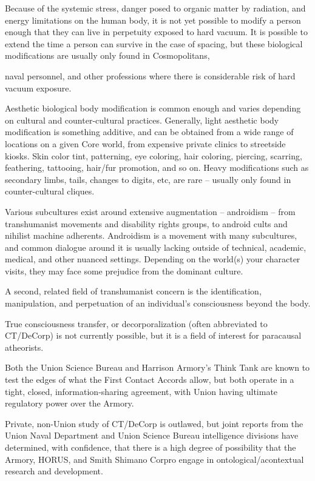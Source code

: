 Because of the systemic stress, danger posed to organic matter by radiation, and energy  
limitations on the human body, it is not yet possible to modify a person enough that they can live  
in perpetuity exposed to hard vacuum. It is possible to extend the time a person can survive in  
the case of spacing, but these biological modifications are usually only found in Cosmopolitans,  

                                                                                                                  


naval personnel, and other professions where there is considerable risk of hard vacuum  
exposure.  
 

Aesthetic biological body modification is common enough and varies depending on cultural and  
counter-cultural practices. Generally, light aesthetic body modification is something additive, and  
can be obtained from a wide range of locations on a given Core world, from expensive private  
clinics to streetside kiosks. Skin color tint, patterning, eye coloring, hair coloring, piercing,  
scarring, feathering, tattooing, hair/fur promotion, and so on. Heavy modifications such as  
secondary limbs, tails, changes to digits, etc, are rare -- usually only found in counter-cultural  
cliques.   
 

Various subcultures exist around extensive augmentation -- androidism -- from transhumanist  
movements and disability rights groups, to android cults and nihilist machine adherents.  
Androidism is a movement with many subcultures, and common dialogue around it is usually  
lacking outside of technical, academic, medical, and other nuanced settings. Depending on the  
world(s) your character visits, they may face some prejudice from the dominant culture. 
 

A second, related field of transhumanist concern is the identification, manipulation, and  
perpetuation of an individual’s consciousness beyond the body.   
 

True consciousness transfer, or decorporalization (often abbreviated to CT/DeCorp) is not  
currently possible, but it is a field of interest for paracausal atheorists. 
 
Both the Union Science Bureau and Harrison Armory’s Think Tank are known to test the edges of  
what the First Contact Accords allow, but both operate in a tight, closed, information-sharing  
agreement, with Union having ultimate regulatory power over the Armory. 
 

Private, non-Union study of CT/DeCorp is outlawed, but joint reports from the Union Naval  
Department and Union Science Bureau intelligence divisions have determined, with confidence,  
that there is a high degree of possibility that the Armory, HORUS, and Smith Shimano Corpro  
engage in ontological/acontextual research and development.  
 


